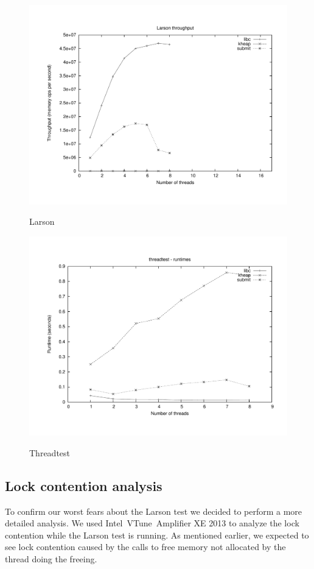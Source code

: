 \documentclass[oneside]{amsart}
\theoremstyle{definition}
\theoremstyle{remark}
\numberwithin{equation}{section}
\begin{document}
\begin{figure}[h]
    \caption{Larson}
    \centering
    \includegraphics[scale=0.33]{../benchmarks/larson/larson.pdf}
    \label{fig:plot}
\end{figure}

\begin{figure}[h]
    \caption{Threadtest}
    \centering
    \includegraphics[scale=0.33]{../benchmarks/threadtest/threadtest.pdf}
    \label{fig:plot}
\end{figure}

\subsection{Lock contention analysis}
To confirm our worst fears about the Larson test we decided to perform a more detailed analysis. We
used Intel\textregistered\ VTune\texttrademark\  Amplifier XE 2013 to analyze the lock contention
while the Larson test is running. As mentioned earlier, we expected to see lock contention caused by
the calls to free memory not allocated by the thread doing the freeing.
\end{document}
